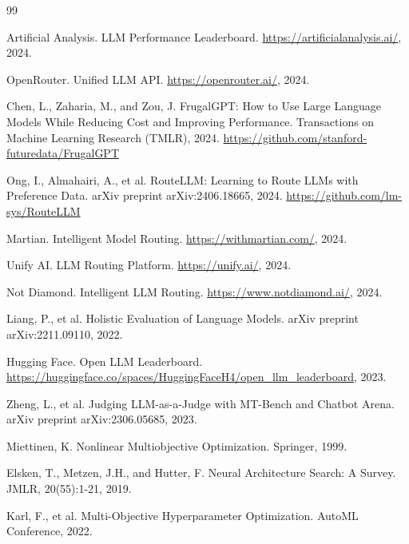 \documentclass[11pt,a4paper]{article}
\begin{document}
\begin{thebibliography}{99}

Artificial Analysis.
\newblock LLM Performance Leaderboard.
\newblock \url{https://artificialanalysis.ai/}, 2024.

OpenRouter.
\newblock Unified LLM API.
\newblock \url{https://openrouter.ai/}, 2024.

Chen, L., Zaharia, M., and Zou, J.
\newblock FrugalGPT: How to Use Large Language Models While Reducing Cost and Improving Performance.
\newblock Transactions on Machine Learning Research (TMLR), 2024.
\newblock \url{https://github.com/stanford-futuredata/FrugalGPT}

Ong, I., Almahairi, A., et al.
\newblock RouteLLM: Learning to Route LLMs with Preference Data.
\newblock arXiv preprint arXiv:2406.18665, 2024.
\newblock \url{https://github.com/lm-sys/RouteLLM}

Martian.
\newblock Intelligent Model Routing.
\newblock \url{https://withmartian.com/}, 2024.

Unify AI.
\newblock LLM Routing Platform.
\newblock \url{https://unify.ai/}, 2024.

Not Diamond.
\newblock Intelligent LLM Routing.
\newblock \url{https://www.notdiamond.ai/}, 2024.

Liang, P., et al.
\newblock Holistic Evaluation of Language Models.
\newblock arXiv preprint arXiv:2211.09110, 2022.

Hugging Face.
\newblock Open LLM Leaderboard.
\newblock \url{https://huggingface.co/spaces/HuggingFaceH4/open_llm_leaderboard}, 2023.

Zheng, L., et al.
\newblock Judging LLM-as-a-Judge with MT-Bench and Chatbot Arena.
\newblock arXiv preprint arXiv:2306.05685, 2023.

Miettinen, K.
\newblock Nonlinear Multiobjective Optimization.
\newblock Springer, 1999.

Elsken, T., Metzen, J.H., and Hutter, F.
\newblock Neural Architecture Search: A Survey.
\newblock JMLR, 20(55):1-21, 2019.

Karl, F., et al.
\newblock Multi-Objective Hyperparameter Optimization.
\newblock AutoML Conference, 2022.


\end{thebibliography}
\end{document}
